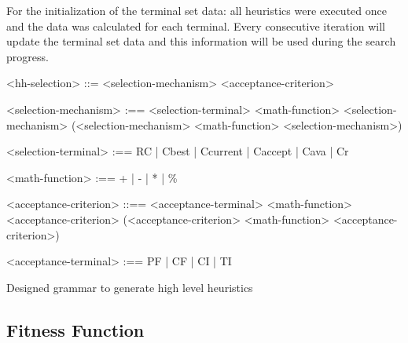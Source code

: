 \documentclass[conference]{IEEEtran}
\begin{document}

 For the initialization of the terminal set data: all heuristics were executed once and the data was calculated for each terminal. Every consecutive iteration will update the terminal set data and this information will be used during the search progress.
 

 \begin{Grammar}
 	\begin{grammar}
 		<hh-selection> ::= <selection-mechanism> <acceptance-criterion> 
 		
 		<selection-mechanism> :==  <selection-terminal>   
 		\alt <selection-mechanism> <math-function> <selection-mechanism> 
 		\alt (<selection-mechanism> <math-function> <selection-mechanism>) 
 		
 		<selection-terminal> :== 
 		RC 
 		| Cbest 
 		| Ccurrent 
 		| Caccept 
 		| Cava 
 		| Cr
 		
 		<math-function> :== + 
 		| - 
 		| * 
 		| \%
 		
 		<acceptance-criterion> ::== <acceptance-terminal> 
 		\alt <acceptance-criterion> <math-function>
 		<acceptance-criterion>
 		\alt (<acceptance-criterion>  <math-function> <acceptance-criterion>) 
 		
 		<acceptance-terminal> :== PF | CF | CI | TI
 		
 		
 		
 	\end{grammar}
 	\caption{Designed grammar to generate high level heuristics}
 	\label{grammar:proposedGrammar}
 \end{Grammar}

%
\subsection{Fitness Function}
\label{subsection:fitnessFunction}
\end{document}
